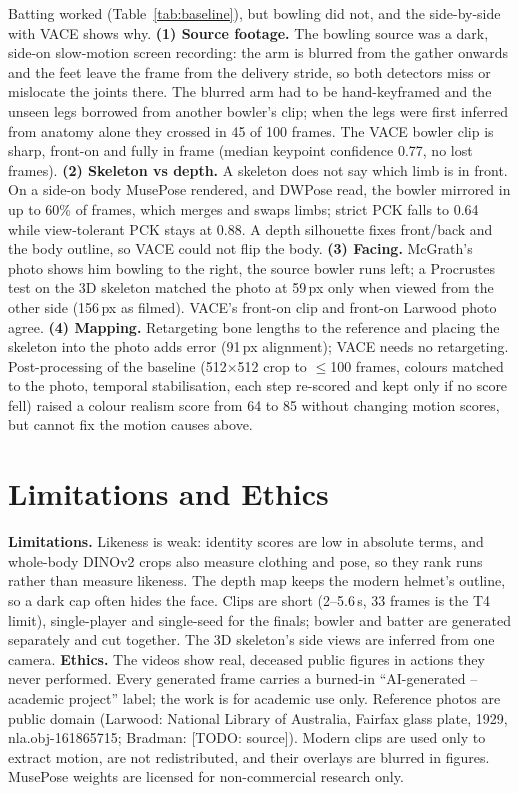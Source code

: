 Batting worked (Table~\ref{tab:baseline}), but bowling did not, and the side-by-side with VACE shows why.
\textbf{(1) Source footage.} The bowling source was a dark, side-on slow-motion screen recording: the arm is blurred
from the gather onwards and the feet leave the frame from the delivery stride, so both detectors miss or mislocate the
joints there. The blurred arm had to be hand-keyframed and the unseen legs borrowed from another bowler's clip; when the
legs were first inferred from anatomy alone they crossed in 45 of 100 frames. The VACE bowler clip is sharp,
front-on and fully in frame (median keypoint confidence 0.77, no lost frames). \textbf{(2) Skeleton vs depth.} A
skeleton does not say which limb is in front. On a side-on body MusePose rendered, and DWPose read, the bowler mirrored in
up to 60\% of frames, which merges and swaps limbs; strict PCK falls to 0.64 while view-tolerant PCK stays at 0.88. A
depth silhouette fixes front/back and the body outline, so VACE could not flip the body. \textbf{(3) Facing.} McGrath's
photo shows him bowling to the right, the source bowler runs left; a Procrustes test on the 3D skeleton matched the photo
at 59\,px only when viewed from the other side (156\,px as filmed). VACE's front-on clip and front-on Larwood photo
agree. \textbf{(4) Mapping.} Retargeting bone lengths to the reference and placing the skeleton into the photo adds error
(91\,px alignment); VACE needs no retargeting. Post-processing of the baseline (512$\times$512 crop to $\le$100 frames,
colours matched to the photo, temporal stabilisation, each step re-scored and kept only if no score fell) raised a colour
realism score from 64 to 85 without changing motion scores, but cannot fix the motion causes above.

\section{Limitations and Ethics}
\textbf{Limitations.} Likeness is weak: identity scores are low in absolute terms, and whole-body DINOv2 crops also
measure clothing and pose, so they rank runs rather than measure likeness. The depth map keeps the modern helmet's
outline, so a dark cap often hides the face. Clips are short (2--5.6\,s, 33 frames is the T4 limit), single-player and
single-seed for the finals; bowler and batter are generated separately and cut together. The 3D skeleton's side views
are inferred from one camera.
\textbf{Ethics.} The videos show real, deceased public figures in actions they never performed. Every generated frame
carries a burned-in ``AI-generated -- academic project'' label; the work is for academic use only. Reference photos are
public domain (Larwood: National Library of Australia, Fairfax glass plate, 1929, nla.obj-161865715; Bradman: [TODO:
source]). Modern clips are used only to extract motion, are not redistributed, and their overlays are blurred in figures.
MusePose weights are licensed for non-commercial research only.

